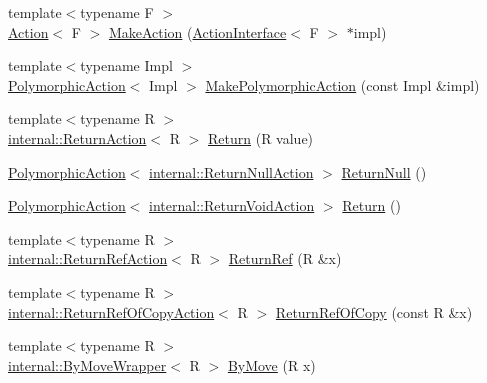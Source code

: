 \begin{DoxyCompactItemize}
\item 
{\footnotesize template$<$typename F $>$ }\\\hyperlink{classtesting_1_1_action}{Action}$<$ F $>$ \hyperlink{namespacetesting_ae6b9960db2b2685e043ce5215291f5b8}{Make\+Action} (\hyperlink{classtesting_1_1_action_interface}{Action\+Interface}$<$ F $>$ $\ast$impl)
\item 
{\footnotesize template$<$typename Impl $>$ }\\\hyperlink{classtesting_1_1_polymorphic_action}{Polymorphic\+Action}$<$ Impl $>$ \hyperlink{namespacetesting_a36bd06c5ea972c6df0bd9f40a7a94c65}{Make\+Polymorphic\+Action} (const Impl \&impl)
\item 
{\footnotesize template$<$typename R $>$ }\\\hyperlink{classtesting_1_1internal_1_1_return_action}{internal\+::\+Return\+Action}$<$ R $>$ \hyperlink{namespacetesting_af6d1c13e9376c77671e37545cd84359c}{Return} (R value)
\item 
\hyperlink{classtesting_1_1_polymorphic_action}{Polymorphic\+Action}$<$ \hyperlink{classtesting_1_1internal_1_1_return_null_action}{internal\+::\+Return\+Null\+Action} $>$ \hyperlink{namespacetesting_aa0331596e269114da101f810d3a1b88b}{Return\+Null} ()
\item 
\hyperlink{classtesting_1_1_polymorphic_action}{Polymorphic\+Action}$<$ \hyperlink{classtesting_1_1internal_1_1_return_void_action}{internal\+::\+Return\+Void\+Action} $>$ \hyperlink{namespacetesting_a8da8e53d2e7bc4e3c531f7435ad04823}{Return} ()
\item 
{\footnotesize template$<$typename R $>$ }\\\hyperlink{classtesting_1_1internal_1_1_return_ref_action}{internal\+::\+Return\+Ref\+Action}$<$ R $>$ \hyperlink{namespacetesting_a18eda8fe9c89ee856c199a2e04ca1641}{Return\+Ref} (R \&x)
\item 
{\footnotesize template$<$typename R $>$ }\\\hyperlink{classtesting_1_1internal_1_1_return_ref_of_copy_action}{internal\+::\+Return\+Ref\+Of\+Copy\+Action}$<$ R $>$ \hyperlink{namespacetesting_ac1b75444c89371dc25ebcfcc48336201}{Return\+Ref\+Of\+Copy} (const R \&x)
\item 
{\footnotesize template$<$typename R $>$ }\\\hyperlink{structtesting_1_1internal_1_1_by_move_wrapper}{internal\+::\+By\+Move\+Wrapper}$<$ R $>$ \hyperlink{namespacetesting_acaa432211a3aec62e3d0f24b47bd2dae}{By\+Move} (R x)

\end{DoxyCompactItemize}
